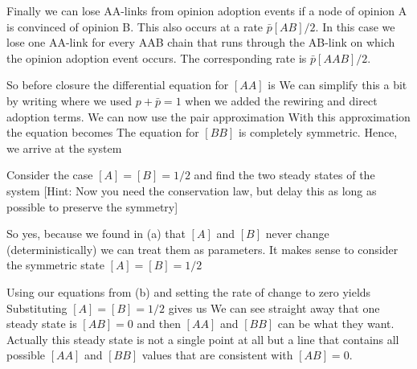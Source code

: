 Finally we can lose AA-links from opinion adoption events if a node of opinion A is convinced of opinion B. This also occurs at a rate $\bar{p}[AB]/2$. In this case we lose one AA-link for every AAB chain that runs through the AB-link on which the opinion adoption event occurs. The corresponding rate is $\bar{p}[AAB]/2$.

So before closure the differential equation for $[AA]$ is
We can simplify this a bit by writing  
where we used $p+\bar{p}=1$ when we added the rewiring and direct adoption terms. 
We can now use the pair approximation 
With this approximation the equation becomes  
The equation for $[BB]$ is completely symmetric. Hence, we arrive at the system

\subquestion
Consider the case $[A]=[B]=1/2$ and find the two steady states of the system [Hint: Now you need the conservation law, but delay this as long as possible to preserve the symmetry]

\solution
So yes, because we found in (a) that $[A]$ and $[B]$ never change (deterministically) we can treat them as parameters. It makes sense to consider the symmetric state $[A]=[B]=1/2$

Using our equations from (b) and setting the rate of change to zero yields 
Substituting $[A]=[B]=1/2$ gives us 
We can see straight away that one steady state is $[AB]=0$ and then $[AA]$ and $[BB]$ can be what they want. Actually this steady state is not a single point at all but a line that contains all possible $[AA]$ and $[BB]$ values that are consistent with $[AB]=0$. 

